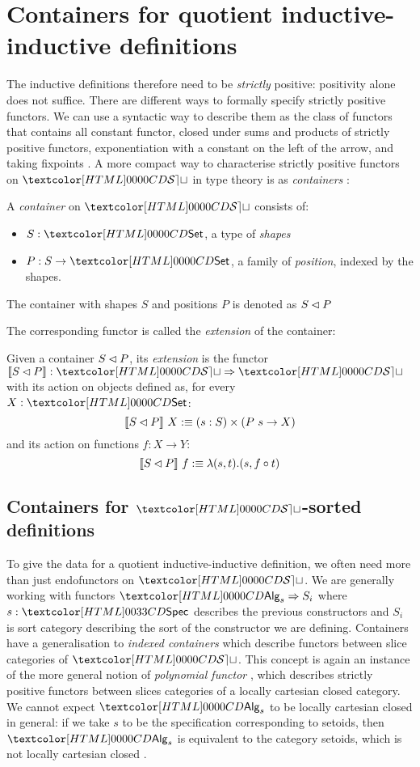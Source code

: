 \chapter{Containers for quotient inductive-inductive definitions}
\label{containers}

The inductive definitions therefore need to be \emph{strictly}
positive: positivity alone does not suffice. There are different ways
to formally specify strictly positive functors. We can use a syntactic
way to describe them as the class of functors that contains all
constant functor, closed under sums and products of strictly positive
functors, exponentiation with a constant on the left of the arrow, and
taking fixpoints \cite{Morris2007}. A more compact way to characterise
strictly positive functors on $\SET$ in type theory is as
\emph{containers} \cite{Abbott2005}:
%
\begin{definition}
\label{def-container}
  A \emph{container} on $\SET$ consists of:
  \begin{itemize}
  \item $S : \Set$, a type of \emph{shapes}
  \item $P : S \to \Set$, a family of \emph{position}, indexed by the shapes.
  \end{itemize}
  The container with shapes $S$ and positions $P$ is denoted as
  $S \lhd P$
\end{definition}
%
The corresponding functor is called the \emph{extension} of the container:
%
\begin{definition}
  Given a container $S \lhd P$, its \emph{extension} is the functor
  $\context{\cont{S}{P}} : \Func{\SET}{\SET}$ with its action on objects
  defined as, for every $X : \Set$:
  $$
  \llbracket S \lhd P \rrbracket\ X :\equiv (s : S) \times (P\ s \to X)
  $$
  and its action on functions $f : X \to Y$:
  $$
  \llbracket S \lhd P \rrbracket\ f :\equiv \lambda (s , t) . (s , f \circ t)
  $$
\end{definition}

\section{Containers for $\SET$-sorted definitions}
To give the data for a quotient inductive-inductive definition, we
often need more than just endofunctors on $\SET$. We are generally
working with functors $\Func{\Alg_s}{S_i}$ where $s : \specty$
describes the previous constructors and $S_i$ is sort category
describing the sort of the constructor we are defining. Containers
have a generalisation to \emph{indexed containers} which describe
functors between slice categories of $\SET$. This concept is again an
instance of the more general notion of \emph{polynomial functor}
\cite{Kock2011}, which describes strictly positive functors between
slices categories of a locally cartesian closed category. We cannot
expect $\Alg_s$ to be locally cartesian closed in general: if we take
$s$ to be the specification corresponding to setoids, then $\Alg_s$ is
equivalent to the category setoids, which is not locally cartesian
closed \cite{Altenkirch2012}.

